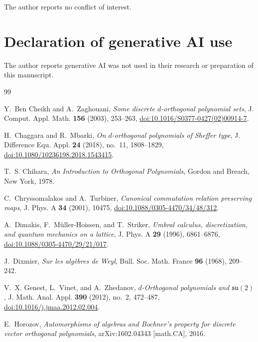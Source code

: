 \documentclass[11pt,reqno]{amsart}
\numberwithin{equation}{section}
\theoremstyle{definition}
\theoremstyle{remark}
\begin{document}
The author reports no conflict of interest.

\section*{Declaration of generative AI use}

The author reports generative AI was not used in their research or preparation of this manuscript.






\begin{thebibliography}{99}

Y.~Ben Cheikh and A.~Zaghouani,
\emph{Some discrete $d$-orthogonal polynomial sets},
J. Comput. Appl. Math. \textbf{156} (2003), 253--263,
\href{https://doi.org/10.1016/S0377-0427(02)00914-7}{doi:10.1016/S0377-0427(02)00914-7}.

H.~Chaggara and R.~Mbarki,
\emph{On $d$-orthogonal polynomials of Sheffer type},
J. Difference Equ. Appl. \textbf{24} (2018), no.~11, 1808--1829,
\href{https://doi.org/10.1080/10236198.2018.1543415}{doi:10.1080/10236198.2018.1543415}.

T.~S. Chihara,
\emph{An Introduction to Orthogonal Polynomials},
Gordon and Breach, New York, 1978.

C.~Chryssomalakos and A.~Turbiner,
\emph{Canonical commutation relation preserving maps},
J. Phys. A \textbf{34} (2001), 10475,
\href{https://doi.org/10.1088/0305-4470/34/48/312}{doi:10.1088/0305-4470/34/48/312}.

A.~Dimakis, F.~M\"uller-Hoissen, and T.~Striker,
\emph{Umbral calculus, discretization, and quantum mechanics on a lattice},
J. Phys. A \textbf{29} (1996), 6861--6876,
\href{https://doi.org/10.1088/0305-4470/29/21/017}{doi:10.1088/0305-4470/29/21/017}.

J.~Dixmier,
\emph{Sur les alg\`ebres de Weyl},
Bull. Soc. Math. France \textbf{96} (1968), 209--242.

V.~X. Genest, L.~Vinet, and A.~Zhedanov,
\emph{$d$-Orthogonal polynomials and $\mathfrak{su}(2)$},
J. Math. Anal. Appl. \textbf{390} (2012), no.~2, 472--487,
\href{https://doi.org/10.1016/j.jmaa.2012.02.004}{doi:10.1016/j.jmaa.2012.02.004}.

E.~Horozov,
\emph{Automorphisms of algebras and Bochner's property for discrete vector orthogonal polynomials},
arXiv:1602.04343 [math.CA], 2016.


\end{thebibliography}
\end{document}
